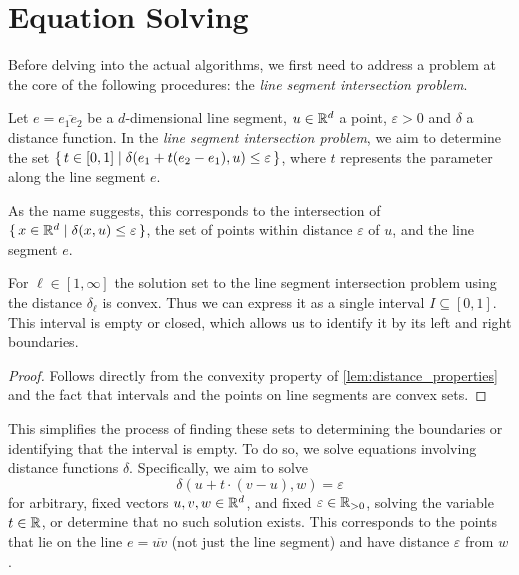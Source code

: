 \section{Equation Solving}
\label{sec:equation_solving}
Before delving into the actual algorithms, we first need to address a problem at the core of the following procedures: the \emph{line segment intersection problem}. 
\begin{definition}
  Let \(e = \overline{e_1e_2}\) be a \(d\)-dimensional line segment, \(u \in \mathbb{R}^d\) a point, \(\varepsilon > 0\) and \(\delta\) a distance function. In the \emph{line segment intersection problem}, we aim to determine the set \newline \(\set{t \in [0, 1] \mid \delta(e_1 + t(e_2 - e_1), u) \leq \varepsilon}\), where \(t\) represents the parameter along the line segment \(e\).

  As the name suggests, this corresponds to the intersection of \(\set{x \in \mathbb{R}^d \mid \delta(x, u) \leq \varepsilon}\), the set of points within distance \(\varepsilon\) of \(u\), and the line segment \(e\). 
\end{definition}

\begin{observation}
  For \(\ell \in [1, \infty]\) the solution set to the line segment intersection problem using the distance \(\delta_\ell\) is convex. Thus we can express it as a single interval \(I \subseteq [0, 1]\). This interval is empty or closed, which allows us to identify it by its left and right boundaries. 
\end{observation}
\begin{proof}
  Follows directly from the convexity property of \cref{lem:distance_properties} and the fact that intervals and the points on line segments are convex sets. 
\end{proof}

This simplifies the process of finding these sets to determining the boundaries or identifying that the interval is empty. To do so, we solve equations involving distance functions \(\delta\). Specifically, we aim to solve 
\begin{equation}
  \delta(u + t \cdot (v - u), w) = \varepsilon \label{eq:eq_solve_main}
\end{equation}
for arbitrary, fixed vectors \(u, v, w \in \mathbb{R}^d\), and fixed \(\varepsilon \in \mathbb{R}_{>0}\), solving the variable \(t \in \mathbb{R}\), or determine that no such solution exists. This corresponds to the points that lie on the line \(e = \overline{uv}\) (not just the line segment) and have distance \(\varepsilon\) from \(w\).

